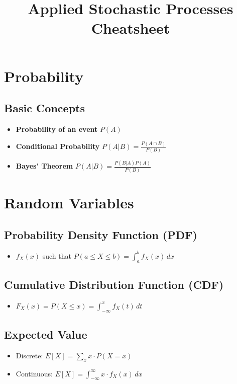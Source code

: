 \documentclass{article}
\title{Applied Stochastic Processes Cheatsheet}
\author{}
\date{}
\begin{document}
\maketitle

\section{Probability}
\subsection{Basic Concepts}
\begin{itemize}
    \item \textbf{Probability of an event} \( P(A) \)
    \item \textbf{Conditional Probability} \( P(A|B) = \frac{P(A \cap B)}{P(B)} \)
    \item \textbf{Bayes' Theorem} \( P(A|B) = \frac{P(B|A)P(A)}{P(B)} \)
\end{itemize}

\section{Random Variables}
\subsection{Probability Density Function (PDF)}
\begin{itemize}
    \item \( f_X(x) \) such that \( P(a \leq X \leq b) = \int_a^b f_X(x) \, dx \)
\end{itemize}

\subsection{Cumulative Distribution Function (CDF)}
\begin{itemize}
    \item \( F_X(x) = P(X \leq x) = \int_{-\infty}^x f_X(t) \, dt \)
\end{itemize}

\subsection{Expected Value}
\begin{itemize}
    \item Discrete: \( E[X] = \sum_x x \cdot P(X = x) \)
    \item Continuous: \( E[X] = \int_{-\infty}^{\infty} x \cdot f_X(x) \, dx \)
\end{itemize}
\end{document}
